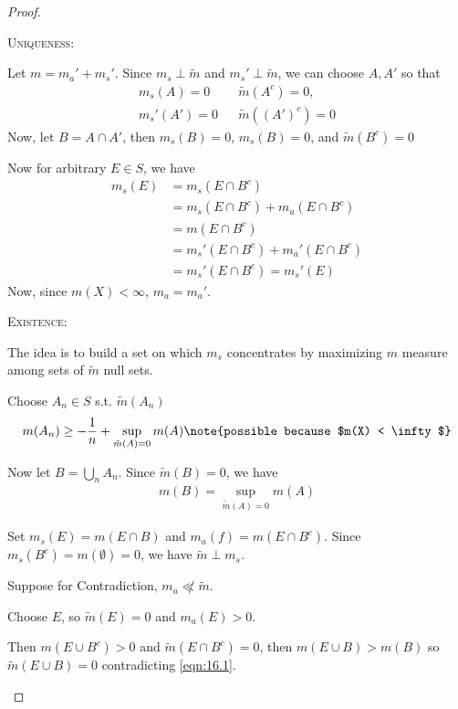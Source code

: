 \begin{proof} \phantom{.} \hfill
	\begin{steps}
	\item \textsc{Uniqueness:} \par
			Let $m = m_{a}' + m_{s}'$.
			Since $m_{s} \perp \tilde m$ and $m_{s}' \perp \tilde m$, we can choose
			$A , A'$ so that
      \begin{align*}
        m_s (A) = 0    && \tilde m (A^{c}) = 0, \\
        m_s' (A') = 0  && \tilde m ( (A')^c) = 0
			\end{align*}
			Now, let $B = A \cap A'$, then  $m_s (B) = 0$, $m_s (B) = 0$, and $\tilde m(B^c) = 0$

			Now for arbitrary $E \in S$, we have
			\begin{align*}
				m_s (E) &= m_s ( E \cap B^c) \\
						&= m_s (E \cap B^c) + m_a (E \cap B^c) \\
						&= m (E \cap B^c) \\
						&= m_s' (E \cap B^c) + m_a' (E \cap B^c) \\
						&= m_s' (E \cap B^c) = m_s'(E)
			\end{align*}
			Now, since $m (X) < \infty$, $m_a = m_a'$.
		\item \textsc{Existence:}

			The idea is to build a set on which $m_s$ concentrates by maximizing $m$ measure among sets of $\tilde m$ null sets.

			Choose $A_{n} \in S$ s.t. $ \tilde m (A_{n})$
			\begin{align*}
        m(A_{n}) \geq -\frac{1}{n} + \sup_{\tilde{m} (A) = 0} m(A)\note{possible because $m(X) < \infty$}
			\end{align*}


			Now let  $B = \bigcup_{n} A_{n}$. Since $\tilde m (B) = 0$, we have
      \begin{align}\label{eqn:16.1}
				m(B) = \sup_{\tilde m (A) = 0} m (A)
			\end{align}

			Set $m_s (E) = m (E \cap B)$ and $m_a (f) = m (E \cap B^c)$.
			Since  $m_s (B^c) = m( \emptyset) = 0$, we have $\tilde m \perp m_s$.


			Suppose for Contradiction, $m_a \not \ll \tilde m$.

			Choose $E$, so $\tilde m (E) = 0$ and $m_a (E) > 0$.

			Then $m(E \cup B^c) > 0$ and $\tilde m (E \cap B^c) = 0$, then
			$m(E \cup B) > m (B)$
      so  $\tilde m (E \cup B) = 0$ contradicting \ref{eqn:16.1}.
	\end{steps}
\end{proof}

